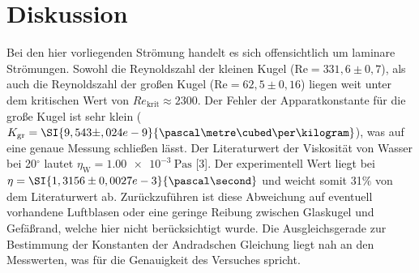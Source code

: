 \newpage
\section{Diskussion}
Bei den hier vorliegenden Strömung handelt es sich offensichtlich um laminare Strömungen. Sowohl die Reynoldszahl der kleinen Kugel ($\text{Re} = 331,6 \pm 0,7$), als auch die Reynoldszahl der großen Kugel ($\text{Re} = 62,5 \pm 0,16$) liegen weit unter dem kritischen Wert von $Re_\text{krit} \approx 2300$.
Der Fehler der Apparatkonstante für die große Kugel ist sehr klein ($K_\text{gr} = \SI{9,543\pm ,024e-9}{\pascal\metre\cubed\per\kilogram}$), was auf eine genaue Messung schließen lässt. 
Der Literaturwert der Viskosität von Wasser bei 20$^\circ$ lautet $\eta_\text{W} = \SI{1,00e-3}{\pascal\second}$ [3].
Der experimentell Wert liegt bei $\eta = \SI{1,3156\pm0,0027e-3}{\pascal\second}$ und weicht somit 31$\%$ von dem Literaturwert ab. Zurückzuführen ist diese Abweichung auf eventuell vorhandene Luftblasen oder eine geringe Reibung zwischen Glaskugel und Gefäßrand, welche hier nicht berücksichtigt wurde.
Die Ausgleichsgerade zur Bestimmung der Konstanten der Andradschen Gleichung liegt nah an den Messwerten, was für die Genauigkeit des Versuches spricht.